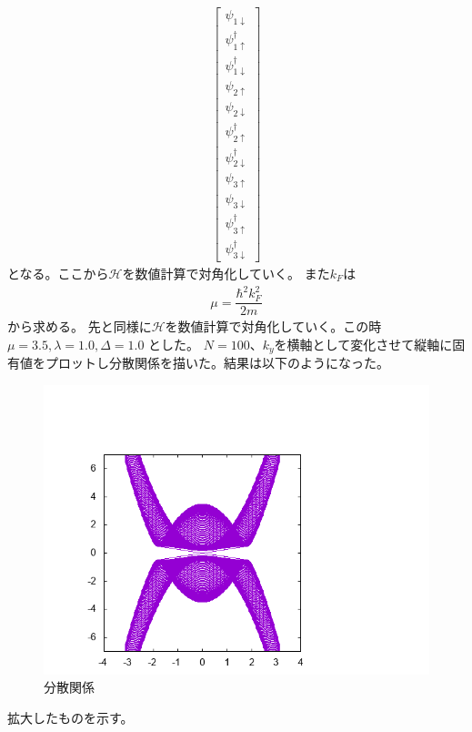 \documentclass{jarticle}
\begin{document}
\begin{align}
\begin{bmatrix}
\psi_{1\downarrow} \\ 
\psi_{1\uparrow}^\dagger \\ 
\psi_{1\downarrow}^\dagger \\ 
\psi_{2\uparrow} \\ 
\psi_{2\downarrow} \\ 
\psi_{2\uparrow}^\dagger \\ 
\psi_{2\downarrow}^\dagger \\ 
\psi_{3\uparrow} \\ 
\psi_{3\downarrow} \\ 
\psi_{3\uparrow}^\dagger \\ 
\psi_{3\downarrow}^\dagger
\end{bmatrix} 
\end{align}
となる。ここから$\mathcal{H}$を数値計算で対角化していく。
また$k_{F}$は
\begin{align}
\mu=\dfrac{\hbar^{2}k_F^{2}}{2m}
\end{align}
から求める。
先と同様に$\mathcal{H}$を数値計算で対角化していく。この時$\mu=3.5, \lambda=1.0, \Delta=1.0$	とした。
$N=100$、$k_y$を横軸として変化させて縦軸に固有値をプロットし分散関係を描いた。結果は以下のようになった。\\
\begin{figure}[H]
	\centering
	\includegraphics[scale=0.7]{../../20/KS/20-1/graph/data.png}
	\caption{分散関係}
		\label{3ek}
\end{figure}
拡大したものを示す。
\end{document}
